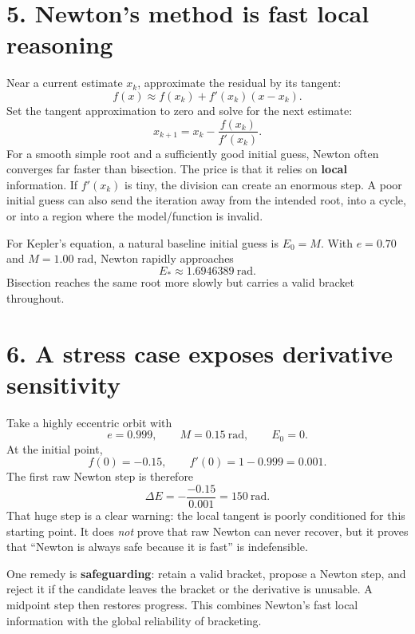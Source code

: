 \documentclass[11pt,a4paper]{article}
\begin{document}
\section*{5. Newton's method is fast local reasoning}
Near a current estimate $x_k$, approximate the residual by its tangent:
\begin{equation}
 f(x)\approx f(x_k)+f'(x_k)(x-x_k).
\end{equation}
Set the tangent approximation to zero and solve for the next estimate:
\begin{equation}
 \boxed{x_{k+1}=x_k-\frac{f(x_k)}{f'(x_k)}}.
\end{equation}
For a smooth simple root and a sufficiently good initial guess, Newton often converges far faster than bisection. The price is that it relies on \textbf{local} information. If $f'(x_k)$ is tiny, the division can create an enormous step. A poor initial guess can also send the iteration away from the intended root, into a cycle, or into a region where the model/function is invalid.

For Kepler's equation, a natural baseline initial guess is $E_0=M$. With $e=0.70$ and $M=1.00$ rad, Newton rapidly approaches
\begin{equation}
 E_*\approx1.6946389\ \mathrm{rad}.
\end{equation}
Bisection reaches the same root more slowly but carries a valid bracket throughout.

\section*{6. A stress case exposes derivative sensitivity}
Take a highly eccentric orbit with
\begin{equation}
 e=0.999,\qquad M=0.15\ \mathrm{rad},\qquad E_0=0.
\end{equation}
At the initial point,
\begin{equation}
 f(0)=-0.15,\qquad f'(0)=1-0.999=0.001.
\end{equation}
The first raw Newton step is therefore
\begin{equation}
 \Delta E=-\frac{-0.15}{0.001}=150\ \mathrm{rad}.
\end{equation}
That huge step is a clear warning: the local tangent is poorly conditioned for this starting point. It does \emph{not} prove that raw Newton can never recover, but it proves that ``Newton is always safe because it is fast'' is indefensible.

One remedy is \textbf{safeguarding}: retain a valid bracket, propose a Newton step, and reject it if the candidate leaves the bracket or the derivative is unusable. A midpoint step then restores progress. This combines Newton's fast local information with the global reliability of bracketing.
\end{document}
